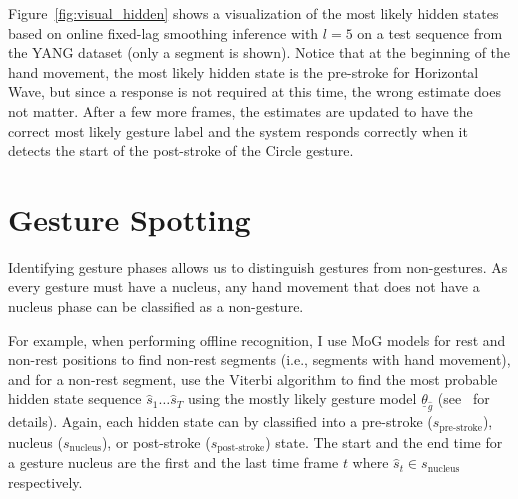 Figure~\ref{fig:visual_hidden} shows a visualization of the
most likely hidden states based on online fixed-lag smoothing inference
with $l = 5$ on a test sequence from the YANG dataset (only a segment is shown).
Notice that at the beginning of the hand movement, the most likely hidden state
is the pre-stroke for Horizontal Wave, but since a response is not required at this
time, the wrong estimate does not matter. After a few more frames, the estimates are
updated to have the correct most likely gesture label and the system
responds correctly when it detects the start of the post-stroke of the Circle
gesture.

\section{Gesture Spotting}
Identifying gesture phases allows us to distinguish gestures from non-gestures.
As every gesture must have a nucleus, any hand movement that does not have a
nucleus phase can be classified as a non-gesture. 

For example, when performing offline recognition, I use
MoG models for rest and non-rest positions to find non-rest segments (i.e.,
segments with hand movement), and for a non-rest segment, use
the Viterbi algorithm to find the most probable hidden state sequence $\hat{s}_1\ldots\hat{s}_T$ using
the mostly likely gesture model $\underline{\theta}_{\hat{g}}$
(see~\cite{yin13} for details).
Again, each hidden state can by classified into a pre-stroke
($s_\text{pre-stroke}$), nucleus ($s_\text{nucleus}$), or post-stroke
($s_\text{post-stroke}$) state.
The start and the end time for a gesture nucleus are the first and the last time
frame $t$ where $\hat{s}_t\in s_{\text{nucleus}}$ respectively. 

